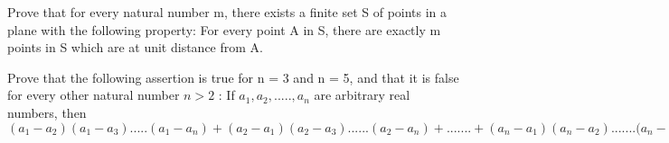 

\item Prove that for every natural number m, there exists a finite set S of points in a plane with the following property: For every point A in S, there are exactly m points in S which are at unit distance from A.\\

\item Prove that the following assertion is true for n = 3 and n = 5, and that it is false for every other natural number $n > 2$ :
If $a_1, a_2,....., a_n$ are arbitrary real numbers, then $(a_1 - a_2)(a_1 - a_3)..... (a_1 - a_n) + (a_2 - a_1)(a_2 - a_3)...... (a_2 - a_n) +.......+ (a_n - a_1)(a_n - a_2)....... (a_n - a_{n-1} \geq 0$

